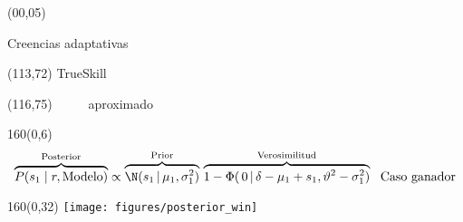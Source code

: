 \documentclass[shownotes,aspectratio=169]{beamer}
\begin{document}
\color{black!85}
\large
 


\begin{frame}
 
 \begin{textblock}{90}(00,05)
\begin{center}
 \huge  \textcolor{black!66}{Creencias adaptativas}
\end{center}

\begin{textblock}{47}(113,72)
\centering \Large  \textcolor{white!55}{TrueSkill} \ \ \ \ \ \
\end{textblock}
\begin{textblock}{47}(116,75)
\centering \Large \ \ \ \ \ \textcolor{white!55}{aproximado}
\end{textblock}

\end{textblock}

{}
\end{frame}



\begin{frame}[plain]

\begin{textblock}{160}(0,6)
\begin{equation*}
\overbrace{P(s_1 \mid r, \text{Modelo})}^{\text{Posterior}} \propto \overbrace{\N(s_1 \, | \, \mu_1, \sigma_1^2) }^{\text{Prior}} \, \overbrace{1 - \Phi(\, 0\,| \, \delta - \mu_1 + s_1 , \vartheta^2 - \sigma_1^2)}^{\text{Verosimilitud}}  \ \  \text{Caso ganador} 
\end{equation*}
\end{textblock}

\begin{textblock}{160}(0,32)
\centering
\texttt{[image: figures/posterior\_win]}
\end{textblock}

\end{frame}
\end{document}

